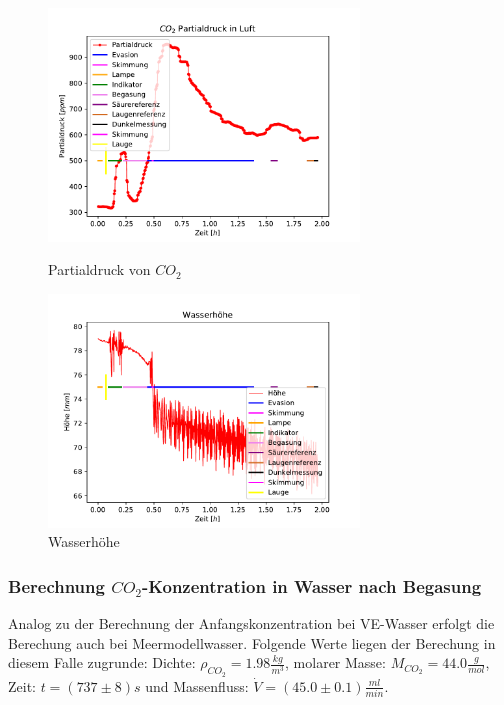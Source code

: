 \documentclass[12pt]{article}
\begin{document}
\begin{figure}[H]
{		\includegraphics[width=82.5mm]{Meerwasser/Partialdruck}
		\caption{Partialdruck von $CO_2$}
	}
	\centering
	\parbox{82.5mm}{
		\centering
		\includegraphics[width=82.5mm]{Meerwasser/Wasserhoehe}
		\caption{Wasserh\"ohe }
	}
	\hfill%
	\parbox{82.5mm}{
		\centering
	}
\end{figure}


\subsubsection{Berechnung $CO_2$-Konzentration in Wasser nach Begasung}

Analog zu der Berechnung der Anfangskonzentration bei VE-Wasser erfolgt die Berechung auch bei
Meermodellwasser. Folgende Werte liegen der Berechung in diesem Falle zugrunde: Dichte: $\rho_{CO_2} = 1.98 \frac{kg}{m^3} $, molarer Masse: $M_{CO_2} = 44.0\frac{g}{mol} $, Zeit:  $t = (737 \pm 8)s$ und Massenfluss: $\dot V = (45.0 \pm 0.1)\frac{ml}{min}$.\\
\end{document}
